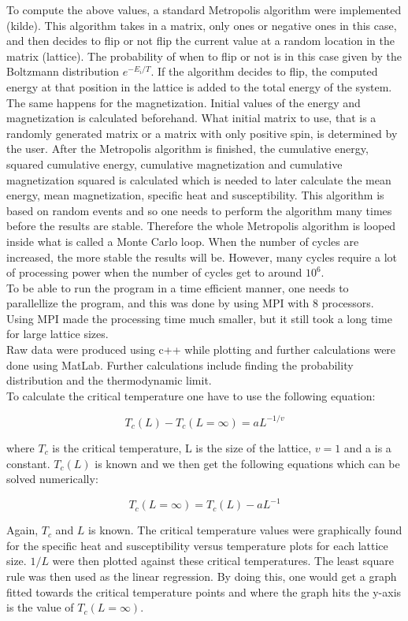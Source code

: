 \documentclass[10pt,a4paper]{article}
\begin{document}
\noindent To compute the above values, a standard Metropolis algorithm were implemented (kilde). This algorithm takes in a matrix, only ones or negative ones in this case, and then decides to flip or not flip the current value at a random location in the matrix (lattice). The probability of when to flip or not is in this case given by the Boltzmann distribution $e^{-E_i / T}$. If the algorithm decides to flip, the computed energy at that position in the lattice is added to the total energy of the system. The same happens for the magnetization. Initial values of the energy and magnetization is calculated beforehand. What initial matrix to use, that is a randomly generated matrix or a matrix with only positive spin, is determined by the user. After the Metropolis algorithm is finished, the cumulative energy, squared cumulative energy, cumulative magnetization and cumulative magnetization squared is calculated which is needed to later calculate the mean energy, mean magnetization, specific heat and susceptibility. This algorithm is based on random events and so one needs to perform the algorithm many times before the results are stable. Therefore the whole Metropolis algorithm is looped inside what is called a Monte Carlo loop. When the number of cycles are increased, the more stable the results will be. However, many cycles require a lot of processing power when the number of cycles get to around $10^6$.
\\
To be able to run the program in a time efficient manner, one needs to parallellize the program, and this was done by using MPI with 8 processors. Using MPI made the processing time much smaller, but it still took a long time for large lattice sizes.
\\
Raw data were produced using c++ while plotting and further calculations were done using MatLab. Further calculations include finding the probability distribution and the thermodynamic limit.  
\\
To calculate the critical temperature one have to use the following equation:

$$
T_c(L) - T_c(L=\infty) = aL^{-1/v}
$$

\noindent where $T_c$ is the critical temperature, L is the size of the lattice, $v = 1$ and a is a constant. $T_c(L)$ is known and we then get the following equations which can be solved numerically:

$$
T_c(L = \infty) = T_c(L) - aL^{-1}
$$

\noindent Again, $T_c$ and $L$ is known. The critical temperature values were graphically found for the specific heat and susceptibility versus temperature plots for each lattice size. $1/L$ were then plotted against these critical temperatures. The least square rule was then used as the linear regression. By doing this, one would get a graph fitted towards the critical temperature points and where the graph hits the y-axis is the value of $T_c(L = \infty)$.
\end{document}
